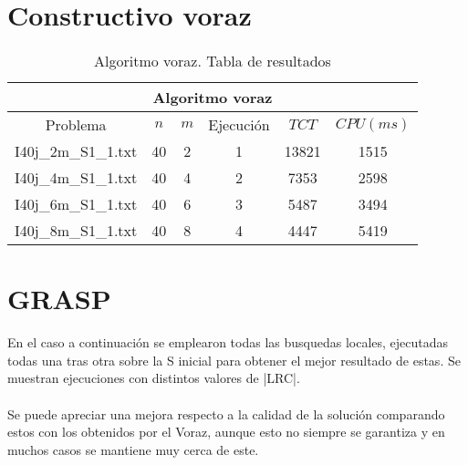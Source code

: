 \section{Constructivo voraz}



   \begin{table}[h]
   {\small
   \begin{center}
   \begin{tabular}{cccccc}
      \multicolumn{6}{c}{Algoritmo voraz} \\
      \hline
      Problema & $n$ & $m$ &  Ejecuci\'on & $TCT$ & $CPU(ms)$ \\
      \hline
      I40j_2m_S1_1.txt & 40 & 2 & 1 & 13821 & 1515 \\
      I40j_4m_S1_1.txt & 40 & 4 & 2 & 7353 & 2598 \\
      I40j_6m_S1_1.txt & 40 & 6 & 3 & 5487 & 3494 \\
      I40j_8m_S1_1.txt & 40 & 8 & 4 & 4447 & 5419 \\     
      \hline
   \end{tabular}
   \end{center}
   }
   \caption{Algoritmo voraz. Tabla de resultados}
   \end{table}


   
\section{GRASP}

En el caso a continuación se emplearon todas las busquedas locales, ejecutadas todas una tras otra sobre la S inicial para obtener el mejor resultado de estas. Se muestran ejecuciones con distintos valores de |LRC|.
\\
\\
Se puede apreciar una mejora respecto a la calidad de la solución comparando estos con los obtenidos por el Voraz, aunque esto no siempre se garantiza y en muchos casos se mantiene muy cerca de este.

\clearpage

